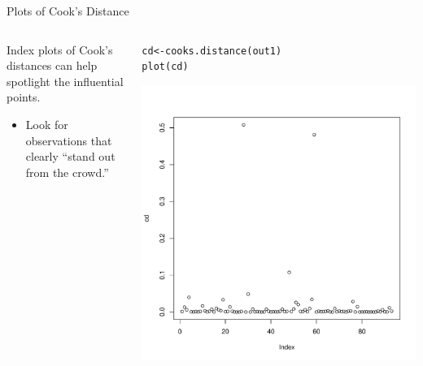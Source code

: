 \documentclass[10pt]{beamer}\usepackage[]{graphicx}\usepackage[]{color}
\makeatletter
\def\maxwidth{ %
  \ifdim\Gin@nat@width>\linewidth
    \linewidth
  \else
    \Gin@nat@width
  \fi
}
\newcommand{\hlstd}[1]{\textcolor[rgb]{0,0,0}{#1}}%
\newcommand{\hlkwb}[1]{\textcolor[rgb]{0,0.341,0.682}{#1}}%
\newcommand{\hlkwd}[1]{\textcolor[rgb]{0.004,0.004,0.506}{#1}}%
\newenvironment{kframe}{%
 \def\at@end@of@kframe{}%
 \ifinner\ifhmode%
  \def\at@end@of@kframe{\end{minipage}}%
  \begin{minipage}{\columnwidth}%
 \fi\fi%
 \def\FrameCommand##1{\hskip\@totalleftmargin \hskip-\fboxsep
 \colorbox{shadecolor}{##1}\hskip-\fboxsep
     \hskip-\linewidth \hskip-\@totalleftmargin \hskip\columnwidth}%
 \MakeFramed {\advance\hsize-\width
   \@totalleftmargin\z@ \linewidth\hsize
   \@setminipage}}%
 {\par\unskip\endMakeFramed%
 \at@end@of@kframe}
\newenvironment{knitrout}{}{} %
\makeatother
\begin{document}
\begin{frame}[fragile]{Plots of Cook's Distance}

  \begin{columns}
    \begin{column}{0.5\textwidth}

      Index plots of Cook's distances can help spotlight the influential points.
      \vb
      \begin{itemize}
      \item Look for observations that clearly ``stand out from the crowd.''
      \end{itemize}

    \end{column}
    \begin{column}{0.5\textwidth}



\begin{knitrout}\footnotesize
{}\color{fgcolor}\begin{kframe}
\begin{alltt}
\hlstd{cd} \hlkwb{<-} \hlkwd{cooks.distance}\hlstd{(out1)}
\hlkwd{plot}\hlstd{(cd)}
\end{alltt}
\end{kframe}

{\centering \includegraphics[width=\maxwidth]{figure/assumptions-unnamed-chunk-26-1} 

}


\end{knitrout}

\end{column}
\end{columns}

\end{frame}
\end{document}

